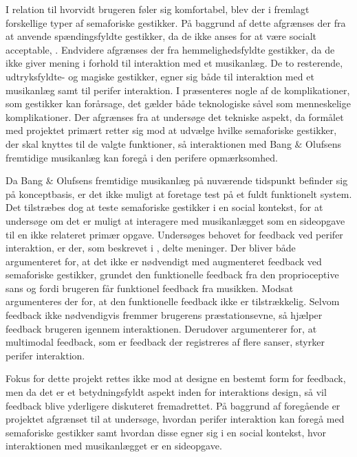 I relation til hvorvidt brugeren føler sig komfortabel, blev der i  fremlagt forskellige typer af semaforiske gestikker. På baggrund af dette afgrænses der fra at anvende spændingsfyldte gestikker, da de ikke anses for at være socialt acceptable, \parencite[s. 277]{PDF:WouldYouDoThat}. Endvidere afgrænses der fra hemmelighedsfyldte gestikker, da de ikke giver mening i forhold til interaktion med et musikanlæg. De to resterende, udtryksfyldte- og magiske gestikker, egner sig både til interaktion med et musikanlæg samt til perifer interaktion.\blankline
%
I  præsenteres nogle af de komplikationer, som gestikker kan forårsage, det gælder både teknologiske såvel som menneskelige komplikationer. Der afgrænses fra at undersøge det tekniske aspekt, da formålet med projektet primært retter sig mod at udvælge hvilke semaforiske gestikker, der skal knyttes til de valgte funktioner, så interaktionen med Bang $\&$ Olufsens fremtidige musikanlæg kan foregå i den perifere opmærksomhed.

Da Bang $\&$ Olufsens fremtidige musikanlæg på nuværende tidspunkt befinder sig på konceptbasis, er det ikke muligt at foretage test på et fuldt funktionelt system. Det tilstræbes dog at teste semaforiske gestikker i en social kontekst, for at undersøge om det er muligt at interagere med musikanlægget som en sideopgave til en ikke relateret primær opgave.\blankline
%
Undersøges behovet for feedback ved perifer interaktion, er der, som beskrevet i , delte meninger. Der bliver både argumenteret for, at det ikke er nødvendigt med augmenteret feedback ved semaforiske gestikker, grundet den funktionelle feedback fra den proprioceptive sans og fordi brugeren får funktionel feedback fra musikken. Modsat argumenteres der for, at den funktionelle feedback ikke er tilstrækkelig. Selvom feedback ikke nødvendigvis fremmer brugerens præstationsevne, så hjælper feedback brugeren igennem interaktionen. Derudover argumenterer \textcite[s. 21]{PDF:FacilitatingPIDesignAndEvaluation} for, at multimodal feedback, som er feedback der registreres af flere sanser, styrker perifer interaktion. 

Fokus for dette projekt rettes ikke mod at designe en bestemt form for feedback, men da det er et betydningsfyldt aspekt inden for interaktions design, så vil feedback blive yderligere diskuteret fremadrettet.\blankline
%
På baggrund af foregående er projektet afgrænset til at undersøge, hvordan perifer interaktion kan foregå med semaforiske gestikker samt hvordan disse egner sig i en social kontekst, hvor interaktionen med musikanlægget er en sideopgave. 
